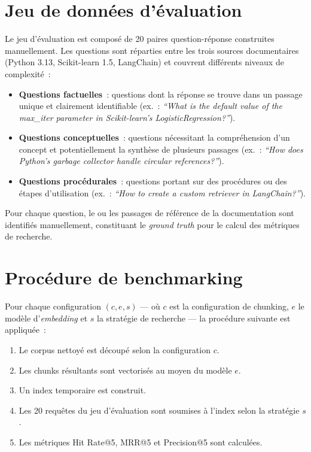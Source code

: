 \documentclass[12pt,a4paper,oneside]{report}
\begin{document}
\section{Jeu de données d'évaluation}

Le jeu d'évaluation est composé de 20 paires question-réponse construites manuellement. Les questions sont réparties entre les trois sources documentaires (Python 3.13, Scikit-learn 1.5, LangChain) et couvrent différents niveaux de complexité~:

\begin{itemize}[nosep]
  \item \textbf{Questions factuelles}~: questions dont la réponse se trouve dans un passage unique et clairement identifiable (ex.~: \textit{``What is the default value of the max\_iter parameter in Scikit-learn's LogisticRegression?''}).
  \item \textbf{Questions conceptuelles}~: questions nécessitant la compréhension d'un concept et potentiellement la synthèse de plusieurs passages (ex.~: \textit{``How does Python's garbage collector handle circular references?''}).
  \item \textbf{Questions procédurales}~: questions portant sur des procédures ou des étapes d'utilisation (ex.~: \textit{``How to create a custom retriever in LangChain?''}).
\end{itemize}

Pour chaque question, le ou les passages de référence de la documentation sont identifiés manuellement, constituant le \textit{ground truth} pour le calcul des métriques de recherche.

\section{Procédure de benchmarking}

Pour chaque configuration $(c, e, s)$ --- où $c$ est la configuration de chunking, $e$ le modèle d'\textit{embedding} et $s$ la stratégie de recherche --- la procédure suivante est appliquée~:

\begin{enumerate}[nosep]
  \item Le corpus nettoyé est découpé selon la configuration $c$.
  \item Les chunks résultants sont vectorisés au moyen du modèle $e$.
  \item Un index temporaire est construit.
  \item Les 20 requêtes du jeu d'évaluation sont soumises à l'index selon la stratégie $s$.
  \item Les métriques Hit Rate@5, MRR@5 et Precision@5 sont calculées.
\end{enumerate}
\end{document}
